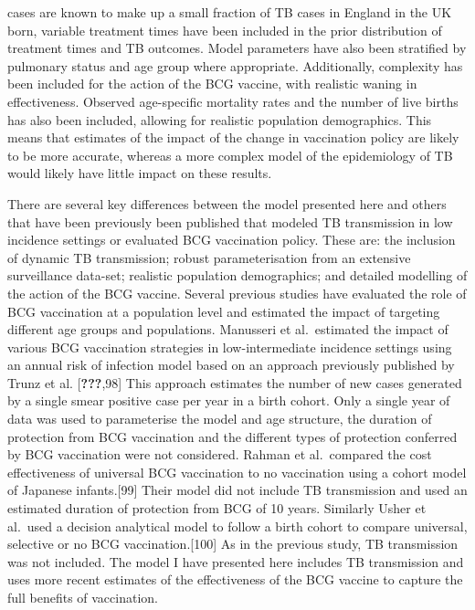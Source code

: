 \documentclass[11pt,twoside]{bristolthesis}
\begin{document}
cases are known to make up a small fraction of TB cases in England in the UK born, variable treatment times have been included in the prior distribution of treatment times and TB outcomes. Model parameters have also been stratified by pulmonary status and age group where appropriate. Additionally, complexity has been included for the action of the BCG vaccine, with realistic waning in effectiveness. Observed age-specific mortality rates and the number of live births has also been included, allowing for realistic population demographics. This means that estimates of the impact of the change in vaccination policy are likely to be more accurate, whereas a more complex model of the epidemiology of TB would likely have little impact on these results.
  
  There are several key differences between the model presented here and others that have been previously been published that modeled TB transmission in low incidence settings or evaluated BCG vaccination policy. These are: the inclusion of dynamic TB transmission; robust parameterisation from an extensive surveillance data-set; realistic population demographics; and detailed modelling of the action of the BCG vaccine. Several previous studies have evaluated the role of BCG vaccination at a population level and estimated the impact of targeting different age groups and populations. Manusseri et al.~estimated the impact of various BCG vaccination strategies in low-intermediate incidence settings using an annual risk of infection model based on an approach previously published by Trunz et al. {[}{\textbf{???}},98{]} This approach estimates the number of new cases generated by a single smear positive case per year in a birth cohort. Only a single year of data was used to parameterise the model and age structure, the duration of protection from BCG vaccination and the different types of protection conferred by BCG vaccination were not considered. Rahman et al.~compared the cost effectiveness of universal BCG vaccination to no vaccination using a cohort model of Japanese infants.{[}99{]} Their model did not include TB transmission and used an estimated duration of protection from BCG of 10 years. Similarly Usher et al.~used a decision analytical model to follow a birth cohort to compare universal, selective or no BCG vaccination.{[}100{]} As in the previous study, TB transmission was not included. The model I have presented here includes TB transmission and uses more recent estimates of the effectiveness of the BCG vaccine to capture the full benefits of vaccination.
  
\end{document}
